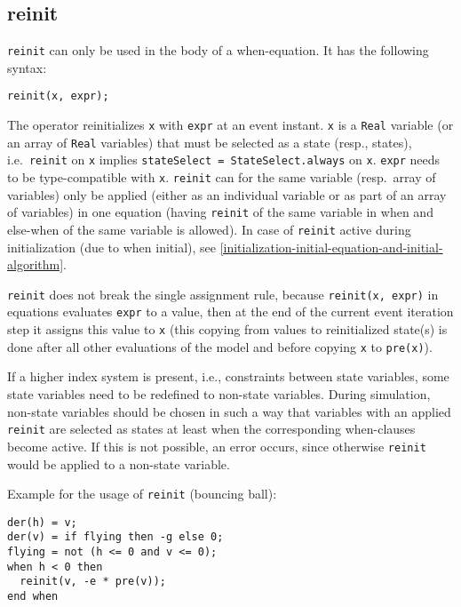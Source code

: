 \subsection{reinit}\label{reinit}

\lstinline!reinit! can only be used in the body of a when-equation.  It has the following syntax:
\begin{lstlisting}[language=modelica]
reinit(x, expr);
\end{lstlisting}

The operator reinitializes \lstinline!x! with \lstinline!expr! at an event instant.  \lstinline!x! is a \lstinline!Real! variable (or an array of \lstinline!Real! variables) that must be selected as a state (resp., states), i.e.\ \lstinline!reinit! on \lstinline!x! implies \lstinline!stateSelect = StateSelect.always! on \lstinline!x!.  \lstinline!expr! needs to be type-compatible with \lstinline!x!.  \lstinline!reinit! can for the same variable (resp.\ array of variables) only be applied (either as an individual variable or as part of an array of variables) in one equation (having \lstinline!reinit! of the same variable in when and else-when of the same variable is allowed).  In case of \lstinline!reinit! active during initialization (due to when initial), see \cref{initialization-initial-equation-and-initial-algorithm}.

\lstinline!reinit! does not break the single assignment rule, because \lstinline!reinit(x, expr)! in equations evaluates \lstinline!expr! to a value,
then at the end of the current event iteration step it assigns this value to \lstinline!x! (this copying from values to reinitialized state(s) is
done after all other evaluations of the model and before copying \lstinline!x! to \lstinline!pre(x)!).

\begin{example}
If a higher index system is present, i.e., constraints between
state variables, some state variables need to be redefined to non-state
variables. During simulation, non-state variables should be chosen in
such a way that variables with an applied \lstinline!reinit! are
selected as states at least when the corresponding when-clauses become
active. If this is not possible, an error occurs, since otherwise
\lstinline!reinit! would be applied to a non-state variable.

Example for the usage of \lstinline!reinit! (bouncing ball):
\begin{lstlisting}[language=modelica]
der(h) = v;
der(v) = if flying then -g else 0;
flying = not (h <= 0 and v <= 0);
when h < 0 then
  reinit(v, -e * pre(v));
end when
\end{lstlisting}
\end{example}

